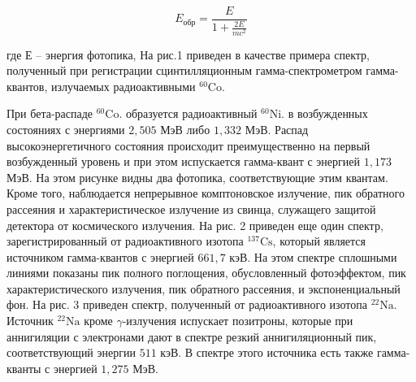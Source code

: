 \begin{equation}
  E_{\text{обр}} = \frac{E}{1 + \frac{2 E}{m c^2}}
\end{equation}

где $Е$ – энергия фотопика, На рис.1 приведен в качестве примера спектр,
полученный при регистрации сцинтилляционным гамма-спектрометром гамма-квантов,
излучаемых радиоактивными ${}^{60}{\text{Co}}$.

При бета-распаде ${}^{60}{\text{Co}}$. образуется радиоактивный
${}^{60}{\text{Ni}}$. в возбужденных состояниях с энергиями $2,505$ МэВ либо
$1,332$ МэВ. Распад высокоэнергетичного состояния происходит преимущественно на
первый возбужденный уровень и при этом испускается гамма-квант с энергией
$1,173$ МэВ. На этом рисунке видны два фотопика, соответствующие этим квантам.
Кроме того, наблюдается непрерывное комптоновское излучение, пик обратного
рассеяния и характеристическое излучение из свинца, служащего защитой детектора
от космического излучения. На рис. 2 приведен еще один спектр,
зарегистрированный от радиоактивного изотопа ${}^{137}{\text{Cs}}$, который
является источником гамма-квантов с энергией $661,7$ кэВ. На этом спектре
сплошными линиями показаны пик полного поглощения, обусловленный фотоэффектом,
пик характеристического излучения, пик обратного рассеяния, и экспоненциальный
фон. На рис. 3 приведен спектр, полученный от радиоактивного изотопа
${}^{22}{\text{Na}}$. Источник ${}^{22}{\text{Na}}$ кроме $\gamma$-излучения
испускает позитроны, которые при аннигиляции с электронами дают в спектре резкий
аннигиляционный пик, соответствующий энергии $511$ кэВ. В спектре этого
источника есть также гамма-кванты с энергией $1,275$ МэВ.
